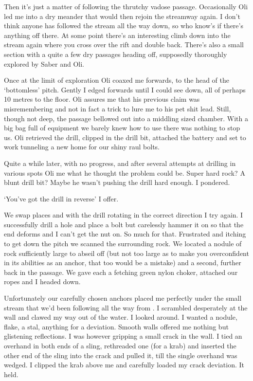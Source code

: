 Then it’s  just a matter of following the thrutchy vadose passage. Occasionally Oli led me into a dry meander that would then rejoin the streamway again. I don’t think anyone has followed the stream all the way down, so who know’s if there’s anything off there. At some point there’s an interesting climb down into the stream again where you cross over the rift and double back. There’s also a small section with a quite a few dry passages heading off, supposedly thoroughly explored by Saber and Oli. 
 
Once at the limit of exploration Oli coaxed me forwards, to the head of the ‘bottomless’ pitch. Gently I edged forwards until I could see down, all of perhaps 10 metres to the floor. Oli assures me that his previous claim was misremembering and not in fact a trick to lure me to his pet shit lead. Still, though not deep, the passage bellowed out into a middling sized chamber. With a big bag full of equipment we barely knew how to use there was nothing to stop us. Oli retrieved the drill, clipped in the drill bit, attached the battery and set to work tunneling a new home for our shiny raul bolts. 
 
Quite a while later, with no progress, and after several attempts at drilling in various spots  Oli me what he thought the problem could be. Super hard rock? A blunt drill bit? Maybe he wasn’t pushing the drill hard enough. I pondered. 

`You've got the drill in reverse' I offer. 

We swap places and with the drill rotating in the correct direction I try again. I successfully drill a hole and place a bolt but carelessly hammer it on so that the end deforms and I can’t get the nut on. So much for that. Frustrated and itching to get down the pitch we scanned the surrounding rock. We located a nodule of rock sufficiently large to abseil off (but not too large as to make you overconfident in its abilities as an anchor, that too would be a mistake) and a second, further back in the passage. We gave each a fetching green nylon choker, attached our ropes and I headed down.
 
Unfortunately our carefully chosen anchors placed me perfectly under the small stream that we’d been following all the way from . I scrambled desperately at the wall and clawed my way out of the water. I looked around. I wanted a nodule, flake, a stal, anything for a deviation. Smooth walls offered me nothing but glistening reflections. I was however gripping a small crack in the wall. I tied an overhand in both ends of a sling, rethreaded one (for a krab) and inserted the other end of the sling into the crack and pulled it, till the single overhand was wedged. I clipped the krab above me and carefully loaded my crack deviation. It held.

